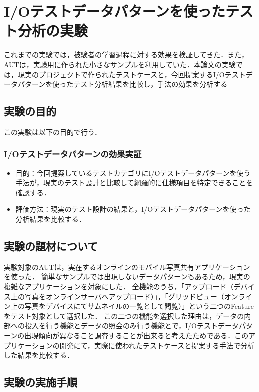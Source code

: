 \documentclass[a4paper,12pt]{jreport}
\begin{document}
\section{I/Oテストデータパターンを使ったテスト分析の実験}
これまでの実験では，被験者の学習過程に対する効果を検証してきた．また，AUTは，実験用に作られた小さなサンプルを利用していた．本論文の実験では，現実のプロジェクトで作られたテストケースと，今回提案するI/Oテストデータパターンを使ったテスト分析結果を比較し，手法の効果を分析する

\subsection{実験の目的}
この実験は以下の目的で行う．

\subsubsection{I/Oテストデータパターンの効果実証}
\begin{itemize}
\item 目的：今回提案しているテストカテゴリにI/Oテストデータパターンを使う手法が，現実のテスト設計と比較して網羅的に仕様項目を特定できることを確認する．
\item 評価方法：現実のテスト設計の結果と，I/Oテストデータパターンを使った分析結果を比較する．
\end{itemize}


\subsection{実験の題材について}
実験対象のAUTは，実在するオンラインのモバイル写真共有アプリケーションを使った．
簡単なサンプルでは出現しないデータパターンもあるため，現実の複雑なアプリケーションを対象にした．
全機能のうち，「アップロード（デバイス上の写真をオンラインサーバへアップロード）」，「グリッドビュー（オンライン上の写真をデバイスにてサムネイルの一覧として閲覧）」という二つのFeatureをテスト対象として選択した．
この二つの機能を選択した理由は，データの内部への投入を行う機能とデータの照会のみ行う機能とで，I/Oテストデータパターンの出現傾向が異なること調査することが出来ると考えたためである．このアプリケーションの開発にて，実際に使われたテストケースと提案する手法で分析した結果を比較する．

\subsection{実験の実施手順}
\end{document}
